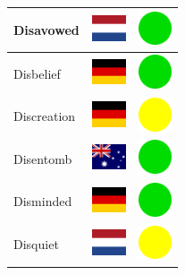 \documentclass[12pt, a4paper, twoside]{report}
\begin{document}
\begin{center}
\begin{longtable}{|p{5cm}|p{2cm}|p{2cm}|}
 Disavowed                                                  & \includegraphics[width=1cm]{../img/flags/nl} &   \includegraphics[width=1cm]{../likes/y} \\ \hline
 Disbelief                                                  & \includegraphics[width=1cm]{../img/flags/de} &   \includegraphics[width=1cm]{../likes/y} \\ \hline
 Discreation                                                & \includegraphics[width=1cm]{../img/flags/de} &   \includegraphics[width=1cm]{../likes/m} \\ \hline
 Disentomb                                                  & \includegraphics[width=1cm]{../img/flags/au} &   \includegraphics[width=1cm]{../likes/y} \\ \hline
 Disminded                                                  & \includegraphics[width=1cm]{../img/flags/de} &   \includegraphics[width=1cm]{../likes/y} \\ \hline
 Disquiet                                                   & \includegraphics[width=1cm]{../img/flags/nl} &   \includegraphics[width=1cm]{../likes/m} \\ \hline

\end{longtable}
\end{center}
\end{document}
